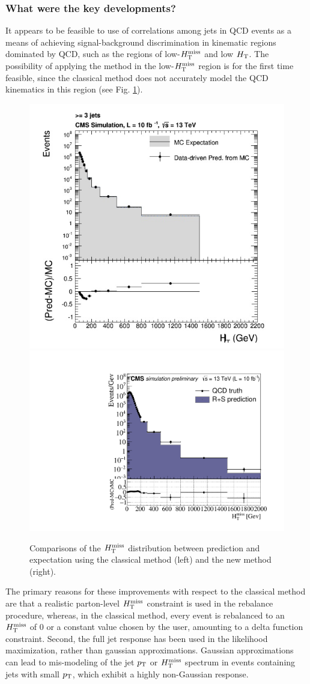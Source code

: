 \subsubsection{What were the key developments?}
It appears to be feasible to use of correlations among jets in QCD events as a means of achieving signal-background discrimination in kinematic regions dominated by QCD, such as the regions of low-$H_{\text{T}}^{\rm miss}$ and low $H_{\rm T}$. The possibility of applying the method in the low-$H_{\text{T}}^{\rm miss}$ region is for the first time feasible, since the classical method does not accurately model the QCD kinematics in this region (see Fig. \ref{fig:OldVsNew}). 
\begin{figure}[h]
\centering
\includegraphics[width=0.49\linewidth]{figures/SusySearches/Ra2b2016/RnSClassicMht.jpg}
\includegraphics[width=0.49\linewidth]{figures/SusySearches/Ra2b2016/LowDeltaPhi_MhtForComparison.pdf}
\caption{Comparisons of the $H_{\text{T}}^{\rm miss}$ distribution between prediction and expectation using the classical method (left) and the new method (right).}
\label{fig:OldVsNew}
\end{figure}
The primary reasons for these improvements with respect to the classical method are that a realistic parton-level $H_{\text{T}}^{\rm miss}$ constraint is used in the rebalance procedure, whereas, in the classical method, every event is rebalanced to an $H_{\text{T}}^{\rm miss}$ of 0 or a constant value chosen by the user, amounting to a delta function constraint. Second, the full jet response has been used in the likelihood maximization, rather than gaussian approximations. Gaussian approximations can lead to mis-modeling of the jet $p_{\text{T}}$ or $H_{\text{T}}^{\rm miss}$ spectrum in events containing jets with small $p_{\text{T}}$, which exhibit a highly non-Gaussian response. 

